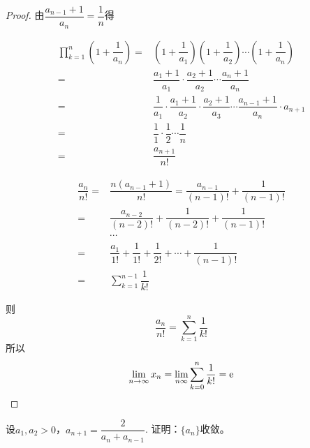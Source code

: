 \begin{proof}

    由$\dfrac{a_{n - 1} + 1}{a_n} = \dfrac{1}{n}$得

    \begin{align*}
        \prod_{k  = 1}^{n}{\left( 1 + \dfrac{1}{a_n} \right)} = & \left( 1 + \dfrac{1}{a_1} \right) \left( 1 + \dfrac{1}{a_2} \right) \cdots \left( 1 + \dfrac{1}{a_n} \right) \\
        = & \dfrac{a_1 + 1}{a_1} \cdot \dfrac{a_2 + 1}{a_2} \cdots \dfrac{a_n + 1}{a_n} \\
        = & \dfrac{1}{a_1} \cdot \dfrac{a_1 + 1}{a_2} \cdot \dfrac{a_2 + 1}{a_3} \cdots \dfrac{a_{n - 1} + 1}{a_n} \cdot a_{n + 1} \\
        = & \dfrac{1}{1} \cdot \dfrac{1}{2} \cdots \dfrac{1}{n} \\
        = & \dfrac{a_{n + 1}}{n!} 
    \end{align*}

    \begin{align*}
        \dfrac{a_n}{n!} = & \dfrac{n(a_{n - 1} + 1)}{n!} = \dfrac{a_{n - 1}}{(n - 1)!} + \dfrac{1}{(n - 1)!} \\
        = & \dfrac{a_{n - 2}}{(n - 2)!} + \dfrac{1}{(n - 2)!} + \dfrac{1}{(n - 1)!} \\
        & \cdots \\ 
        = & \dfrac{a_1}{1!} + \dfrac{1}{1!} + \dfrac{1}{2!} + \cdots + \dfrac{1}{(n - 1)!} \\
        = & \sum\limits_{k  = 1}^{n - 1}{\dfrac{1}{k!}} 
    \end{align*}

    则
    \[\dfrac{a_n}{n!} = \sum\limits_{k  = 1}^{n}{\dfrac{1}{k!}}\]
    所以
    \[\lim\limits_{n \to \infty}{x_n} = \lim\limits_{n\infty}{\sum\limits_{k = 0}^{n}{\dfrac{1}{k!}}} = \mathrm{e}\]

\end{proof}

\begin{proposition}

    设$a_1, a_2 > 0$，$a_{n + 1} = \dfrac{2}{a_n + a_{n - 1}}$. 证明：$\{a_n\}$收敛。

\end{proposition}


